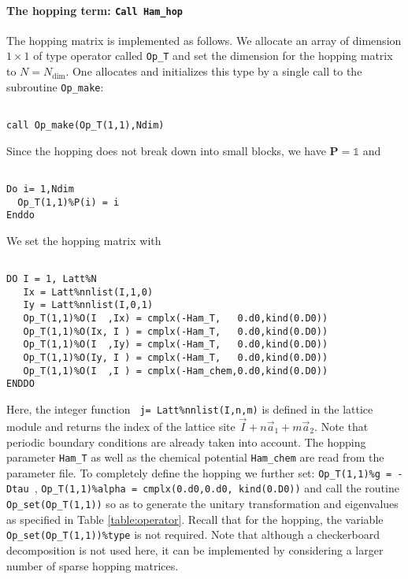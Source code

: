 \documentclass{SciPost}
\begin{document}
%
\paragraph{The hopping term: \texttt{Call Ham\_hop}}
%
The hopping matrix is implemented as follows. 
We allocate an array of dimension $1\times 1$ of type operator  called \texttt{Op\_T} and set the  dimension for the hopping  matrix to $N=N_{\mathrm{dim}}$. One  allocates and initializes this type by a single call to the subroutine \texttt{Op\_make}: 
\begin{lstlisting}

call Op_make(Op_T(1,1),Ndim)

\end{lstlisting}
Since the hopping  does not  break down into small blocks, we have ${\bm P}=\mathds{1}$   and  
\begin{lstlisting}

Do i= 1,Ndim
  Op_T(1,1)%P(i) = i
Enddo

\end{lstlisting}
We set the hopping matrix  with 

\begin{lstlisting}

DO I = 1, Latt%N
   Ix = Latt%nnlist(I,1,0)
   Iy = Latt%nnlist(I,0,1)
   Op_T(1,1)%O(I  ,Ix) = cmplx(-Ham_T,   0.d0,kind(0.D0))
   Op_T(1,1)%O(Ix, I ) = cmplx(-Ham_T,   0.d0,kind(0.D0))
   Op_T(1,1)%O(I  ,Iy) = cmplx(-Ham_T,   0.d0,kind(0.D0))
   Op_T(1,1)%O(Iy, I ) = cmplx(-Ham_T,   0.d0,kind(0.D0))
   Op_T(1,1)%O(I  ,I ) = cmplx(-Ham_chem,0.d0,kind(0.D0))
ENDDO

\end{lstlisting}
Here, the integer function \texttt{  j=  Latt\%nnlist(I,n,m)} is defined in the lattice module and returns the index of the lattice site $ \vec{I} +  n \vec{a}_1 +  m \vec{a}_2$.
Note that periodic boundary conditions are 
already taken into account.  The hopping parameter \texttt{Ham\_T} as well as the chemical potential \texttt{Ham\_chem} are read from the parameter file.  
To completely define the hopping  we further set: \texttt{Op\_T(1,1)\%g = -Dtau }, \texttt{Op\_T(1,1)\%alpha = cmplx(0.d0,0.d0, kind(0.D0))} and call the routine  \texttt{Op\_set(Op\_T(1,1))}  so as to generate  the unitary transformation and eigenvalues as specified in Table \ref{table:operator}.  Recall that for the hopping, the variable  \texttt{Op\_set(Op\_T(1,1))\%type}  is not  required. 
Note that although a checkerboard decomposition is not  used here,  it can be implemented by considering a larger number of sparse hopping matrices.
\end{document}
